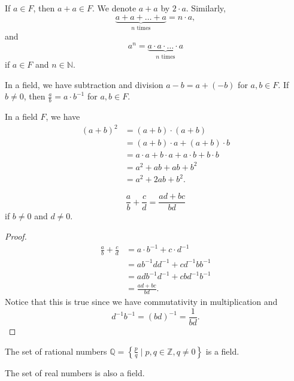 \begin{remark}
  If \(a \in F\), then \(a + a \in F\). We denote \(a + a\) by \(2 \cdot a\). Similarly, 
  \[
    \underbrace{a+a+\dots +a}_{n \text{ times}} = n \cdot a,
  \]   
  and 
  \[
    a^n = \underbrace{a \cdot a \cdot \dots \cdot a}_{n \text{ times}}
  \]
  if \(a \in F\) and \(n \in \mathbb{N} \).  
\end{remark}

\begin{remark}
  In a field, we have subtraction and division \(a - b = a + (-b)\) for \(a, b \in F\). If \(b \neq 0\), then \(\frac{a}{b}=a \cdot b^{-1}\) for \(a,b \in  F \).      
\end{remark}

In a field \(F\), we have 
\begin{align*}
  (a+b)^2 &= (a+b)\cdot(a+b) \\
          &= (a+b)\cdot a + (a+b) \cdot b \\
          &= a \cdot a + b \cdot a + a \cdot b + b \cdot b \\
          &= a^2 + ab + ab + b^2 \\
          &= a^2 + 2ab + b^2.
\end{align*} 

\begin{eg}
\[
  \frac{a}{b} + \frac{c}{d} = \frac{ad + bc}{bd}
\] if \(b \neq 0\) and \(d \neq 0\).  
\end{eg}

\begin{proof}
  \begin{align*}
    \frac{a}{b} + \frac{c}{d} &= a \cdot b^{-1} + c \cdot d^{-1} \\
    &= a b^{-1} d d^{-1} + c d^{-1} b b^{-1} \\
    &= ad b^{-1} d^{-1} + cb d^{-1} b^{-1} \\
    &= \frac{ad + bc}{bd}.       
  \end{align*}
  Notice that this is true since we have commutativity in multiplication and 
 \[
  d^{-1}b^{-1} = (bd)^{-1} = \frac{1}{bd}.
 \]
\end{proof}

\begin{eg}
  The set of rational numbers \(\mathbb{Q} = \left\{ \frac{p}{q} \mid  p,q \in \mathbb{Z} , q \neq 0 \right\} \) is a field. 
\end{eg}

\begin{eg}
  The set of real numbers is also a field.
\end{eg}


